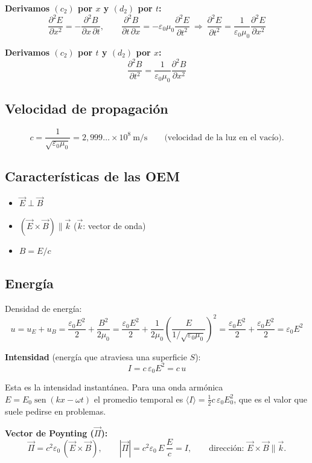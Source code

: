 \documentclass[11pt,a4paper]{article}
\DeclareMathOperator{\sen}{sen}
\begin{document}
\textbf{Derivamos $(c_2)$ por $x$ y $(d_2)$ por $t$:}
\[
\frac{\partial^2E}{\partial x^2}=-\frac{\partial^2B}{\partial x\,\partial t},\qquad
\frac{\partial^2B}{\partial t\,\partial x}=-\varepsilon_0\mu_0\frac{\partial^2E}{\partial t^2}
\ \Rightarrow\
\boxed{\frac{\partial^2E}{\partial t^2}=\frac{1}{\varepsilon_0\mu_0}\frac{\partial^2E}{\partial x^2}}
\]

\textbf{Derivamos $(c_2)$ por $t$ y $(d_2)$ por $x$:}
\[
\boxed{\frac{\partial^2B}{\partial t^2}=\frac{1}{\varepsilon_0\mu_0}\frac{\partial^2B}{\partial x^2}}
\]

\subsection{Velocidad de propagación}
\[
c=\frac{1}{\sqrt{\varepsilon_0\mu_0}}=2{,}999\ldots\times10^{8}\ \text{m/s}
\qquad\text{(velocidad de la luz en el vacío).}
\]

\subsection{Características de las OEM}
\begin{itemize}
  \item $\vec E\perp\vec B$
  \item $(\vec E\times\vec B)\parallel\vec k$ \quad ($\vec k$: vector de onda)
  \item $B=E/c$
\end{itemize}

\subsection{Energía}
Densidad de energía:
\[
u=u_E+u_B=\frac{\varepsilon_0E^2}{2}+\frac{B^2}{2\mu_0}
=\frac{\varepsilon_0E^2}{2}+\frac{1}{2\mu_0}\left(\frac{E}{1/\sqrt{\varepsilon_0\mu_0}}\right)^2
=\frac{\varepsilon_0E^2}{2}+\frac{\varepsilon_0E^2}{2}=\varepsilon_0E^2
\]

\textbf{Intensidad} (energía que atraviesa una superficie $S$):
\[
I=c\,\varepsilon_0E^2=c\,u
\]

\begin{obs}
Esta es la intensidad instantánea. Para una onda armónica $E=E_0\sen(kx-\omega t)$ el promedio
temporal es $\langle I\rangle=\tfrac12 c\,\varepsilon_0E_0^2$, que es el valor que suele pedirse en problemas.
\end{obs}

\textbf{Vector de Poynting ($\vec\Pi$):}
\[
\vec\Pi=c^2\varepsilon_0\,(\vec E\times\vec B),\qquad
|\vec\Pi|=c^2\varepsilon_0\,E\,\frac{E}{c}=I,\qquad
\text{dirección: }\vec E\times\vec B\parallel\vec k.
\]
\end{document}
